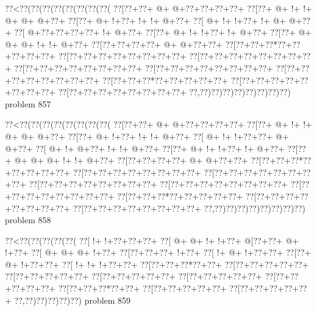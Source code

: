 \vbox{\vbox{\goo
\0??<\0??(\0??(\0??(\0??(\0??(\0??(\0??(\0??(
\0??[\0??+\0??+\- @+\- @+\0??+\0??+\0??+\0??+
\0??[\0??+\- @+\- !+\- !+\- @+\- @+\- @+\0??+
\0??[\0??+\- @+\- !+\0??+\- !+\- !+\- @+\0??+
\0??[\- @+\- !+\- !+\0??+\- !+\- @+\- @+\0??+
\0??[\- @+\0??+\0??+\0??+\0??+\- !+\- @+\0??+
\0??[\0??+\- @+\- !+\- !+\0??+\- !+\- @+\0??+
\0??[\0??+\- @+\- @+\- @+\- !+\- !+\- @+\0??+
\0??[\0??+\0??+\0??+\0??+\- @+\- @+\0??+\0??+
\0??[\0??+\0??+\0??*\0??+\0??+\0??+\0??+\0??+
\0??[\0??+\0??+\0??+\0??+\0??+\0??+\0??+\0??+
\0??[\0??+\0??+\0??+\0??+\0??+\0??+\0??+\0??+
\0??[\0??+\0??+\0??+\0??+\0??+\0??+\0??+\0??+
\0??[\0??+\0??+\0??+\0??+\0??+\0??+\0??+\0??+
\0??[\0??+\0??+\0??+\0??+\0??+\0??+\0??+\0??+
\0??[\0??+\0??+\0??*\0??+\0??+\0??+\0??+\0??+
\0??[\0??+\0??+\0??+\0??+\0??+\0??+\0??+\0??+
\0??[\0??+\0??+\0??+\0??+\0??+\0??+\0??+\0??+
\0??,\0??)\0??)\0??)\0??)\0??)\0??)\0??)\0??)
}
\hfil problem 857\hfil\break
}

\vbox{\vbox{\goo
\0??<\0??(\0??(\0??(\0??(\0??(\0??(\0??(\0??(
\0??[\0??+\0??+\- @+\- @+\0??+\0??+\0??+\0??+
\0??[\0??+\- @+\- !+\- !+\- @+\- @+\- @+\0??+
\0??[\0??+\- @+\- !+\0??+\- !+\- !+\- @+\0??+
\0??[\- @+\- !+\- !+\0??+\0??+\- @+\- @+\0??+
\0??[\- @+\- !+\- @+\0??+\- !+\- !+\- @+\0??+
\0??[\0??+\- @+\- !+\- !+\0??+\- !+\- @+\0??+
\0??[\0??+\- @+\- @+\- @+\- !+\- !+\- @+\0??+
\0??[\0??+\0??+\0??+\0??+\- @+\- @+\0??+\0??+
\0??[\0??+\0??+\0??*\0??+\0??+\0??+\0??+\0??+
\0??[\0??+\0??+\0??+\0??+\0??+\0??+\0??+\0??+
\0??[\0??+\0??+\0??+\0??+\0??+\0??+\0??+\0??+
\0??[\0??+\0??+\0??+\0??+\0??+\0??+\0??+\0??+
\0??[\0??+\0??+\0??+\0??+\0??+\0??+\0??+\0??+
\0??[\0??+\0??+\0??+\0??+\0??+\0??+\0??+\0??+
\0??[\0??+\0??+\0??*\0??+\0??+\0??+\0??+\0??+
\0??[\0??+\0??+\0??+\0??+\0??+\0??+\0??+\0??+
\0??[\0??+\0??+\0??+\0??+\0??+\0??+\0??+\0??+
\0??,\0??)\0??)\0??)\0??)\0??)\0??)\0??)\0??)
}
\hfil problem 858\hfil\break
}

\vbox{\vbox{\goo
\0??<\0??(\0??(\0??(\0??(\0??(
\0??[\- !+\- !+\0??+\0??+\0??+
\0??[\- @+\- @+\- !+\- !+\0??+
\- @[\0??+\0??+\- @+\- !+\0??+
\0??[\- @+\- @+\- @+\- !+\0??+
\0??[\0??+\0??+\0??+\- !+\0??+
\0??[\- !+\- @+\- !+\0??+\0??+
\0??[\0??+\- @+\- !+\0??+\0??+
\0??[\- !+\- !+\- !+\0??+\0??+
\0??[\0??+\0??+\0??*\0??+\0??+
\0??[\0??+\0??+\0??+\0??+\0??+
\0??[\0??+\0??+\0??+\0??+\0??+
\0??[\0??+\0??+\0??+\0??+\0??+
\0??[\0??+\0??+\0??+\0??+\0??+
\0??[\0??+\0??+\0??+\0??+\0??+
\0??[\0??+\0??+\0??*\0??+\0??+
\0??[\0??+\0??+\0??+\0??+\0??+
\0??[\0??+\0??+\0??+\0??+\0??+
\0??,\0??)\0??)\0??)\0??)\0??)
}
\hfil problem 859\hfil\break
}

